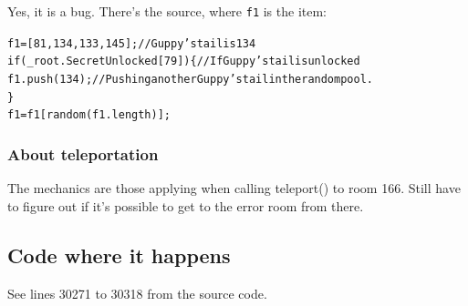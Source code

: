 \noindent Yes, it is a bug. There's the source, where \texttt{f1} is the item:
\begin{alltt}
f1 = [81, 134, 133, 145]; // Guppy's tail is 134
if (_root.SecretUnlocked[79]) \{ // If Guppy's tail is unlocked
   f1.push(134); // Pushing another Guppy's tail in the random pool.
\}
f1 = f1[random(f1.length)];
\end{alltt}

\subsubsection{About teleportation}
The mechanics are those applying when calling teleport() to room 166. Still have to figure out if it's possible to get to the error room from there.

\subsection{Code where it happens}
See lines 30271 to 30318 from the source code.
